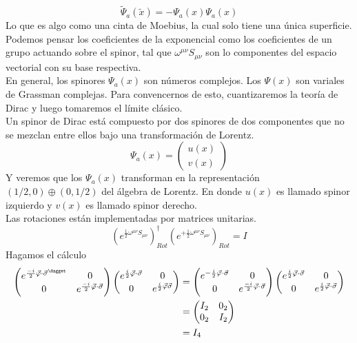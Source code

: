 \documentclass[../main.tex]{subfiles}
\begin{document}
\begin{equation*}
  \tilde{\Psi}_a(\tilde{x}) = -\Psi_a(x) \Psi_a(x)
\end{equation*}
Lo que es algo como una cinta de Moebius, la cual solo tiene una única superficie. \\
Podemos pensar los coeficientes de la exponencial como los coeficientes de un grupo actuando sobre el spinor, tal que $\omega^{\mu \nu}S_{\mu \nu}$ son lo componentes del espacio vectorial con su base respectiva. \\
En general, los spinores $\Psi_a(x)$ son números complejos. Los $\Psi(x)$ son variales de Grassman complejas. Para convencernos de esto, cuantizaremos la teoría de Dirac y luego tomaremos el límite clásico.  \\
Un spinor de Dirac está compuesto por dos spinores de dos componentes que no se mezclan entre ellos bajo una transformación de Lorentz.
\begin{equation*}
  \Psi_a(x) = \begin{pmatrix}
    u(x) \\ v(x)
  \end{pmatrix}
\end{equation*}
Y veremos que los $\Psi_a(x)$ transforman en la representación $\left( 1/2,0 \right)\oplus\left( 0,1/2 \right)$  del álgebra de Lorentz. En donde $u(x)$ es llamado spinor izquierdo y $v(x)$ es llamado spinor derecho. \\
Las rotaciones están implementadas por matrices unitarias. 
\begin{equation}
  \left( e^{\frac{1}{2}\omega^{\mu \nu}S_{\mu \nu}} \right)^\dagger_{Rot} \left( e^{+\frac{1}{2}\omega^{\mu \nu}S_{\mu \nu}} \right)_{Rot} = I
 \end{equation}
 Hagamos el cálculo
 \begin{align*}
   \begin{pmatrix}
     e^{\frac{-i}{2}\vec{\varphi}\cdot\vec{\sigma}^\dagget} & 0 \\ 0 & e^{\frac{-i}{2}\vec{\varphi}\cdot\vec{\sigma}}
   \end{pmatrix}
   \begin{pmatrix}
     e^{\frac{i}{2}\vec{\varphi}\cdot \vec{\sigma}} & 0 \\  0 & e^{\frac{i}{2}\vec{\varphi}\vec{\sigma}} 
   \end{pmatrix} 
   & = 
   \begin{pmatrix}
       e^{-\frac{i}{2}\vec{\varphi}\cdot \vec{\sigma}} & 0 \\  0 & e^{\frac{-i}{2}\vec{\varphi}\cdot{\vec{\sigma}}} 
     \end{pmatrix} 
     \begin{pmatrix}
       e^{\frac{i}{2}\vec{\varphi}\cdot\vec{\sigma}} & 0 \\ 0 &  e^{\frac{i}{2}\vec{\varphi}\cdot \vec{\sigma}}
     \end{pmatrix} \\
  & = \begin{pmatrix}
    I_2 & 0_2 \\ 0_2 & I_2
  \end{pmatrix} \\
   & = I_4
 \end{align*}
\end{document}
